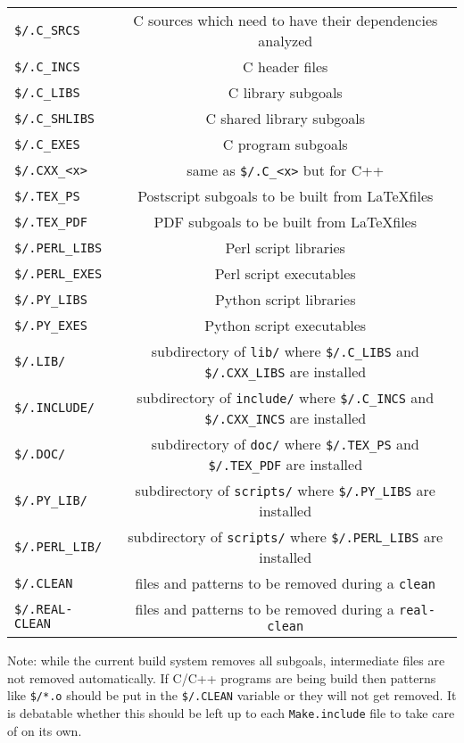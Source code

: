 \documentclass{article}
\begin{document}
\begin{tabular}{lc}
\verb+$/.C_SRCS+ & C sources which need to have their dependencies analyzed\\
\verb+$/.C_INCS+ & C header files\\
\verb+$/.C_LIBS+ & C library subgoals\\
\verb+$/.C_SHLIBS+ & C shared library subgoals\\
\verb+$/.C_EXES+ & C program subgoals\\
\verb+$/.CXX_<x>+ & same as \verb+$/.C_<x>+ but for C++\\
\verb+$/.TEX_PS+ & Postscript subgoals to be built from \LaTeX files\\
\verb+$/.TEX_PDF+ & PDF subgoals to be built from \LaTeX files\\
\verb+$/.PERL_LIBS+ & Perl script libraries\\
\verb+$/.PERL_EXES+ & Perl script executables\\
\verb+$/.PY_LIBS+ & Python script libraries\\
\verb+$/.PY_EXES+ & Python script executables\\
\verb+$/.LIB/+  & subdirectory of \verb+lib/+ where \verb+$/.C_LIBS+ and \verb+$/.CXX_LIBS+ are installed\\
\verb+$/.INCLUDE/+  & subdirectory of \verb+include/+ where \verb+$/.C_INCS+ and \verb+$/.CXX_INCS+ are installed\\
\verb+$/.DOC/+  & subdirectory of \verb+doc/+ where \verb+$/.TEX_PS+ and \verb+$/.TEX_PDF+ are installed\\
\verb+$/.PY_LIB/+  & subdirectory of \verb+scripts/+ where \verb+$/.PY_LIBS+ are installed\\
\verb+$/.PERL_LIB/+  & subdirectory of \verb+scripts/+ where \verb+$/.PERL_LIBS+ are installed\\
\verb+$/.CLEAN+ & files and patterns to be removed during a \verb+clean+\\
\verb+$/.REAL-CLEAN+ & files and patterns to be removed during a \verb+real-clean+\\
\end{tabular}
Note: while the current build system removes all subgoals, intermediate
files are not removed automatically.  If C/C++ programs are being build
then patterns like \verb+$/*.o+ should be put in the \verb+$/.CLEAN+ variable
or they will not get removed.  It is debatable whether this should be left
up to each \verb+Make.include+ file to take care of on its own.
\end{document}
